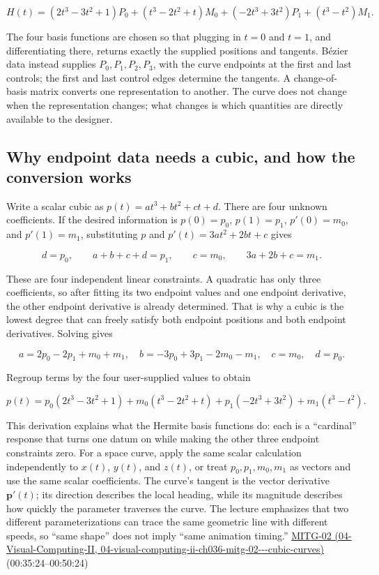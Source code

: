 \[
H(t)=(2t^3-3t^2+1)P_0+(t^3-2t^2+t)M_0+(-2t^3+3t^2)P_1+(t^3-t^2)M_1.
\]

The four basis functions are chosen so that plugging in \(t=0\) and \(t=1\), and differentiating there, returns exactly the supplied positions and tangents. Bézier data instead supplies \(P_0,P_1,P_2,P_3\), with the curve endpoints at the first and last controls; the first and last control edges determine the tangents. A change-of-basis matrix converts one representation to another. The curve does not change when the representation changes; what changes is which quantities are directly available to the designer.

\subsection{Why endpoint data needs a cubic, and how the conversion works}\label{03-visual-computing-i-ch001-why-endpoint-data-needs-a-cubic-and-how-the-conversion-works}

Write a scalar cubic as \(p(t)=at^3+bt^2+ct+d\). There are four unknown coefficients. If the desired information is \(p(0)=p_0\), \(p(1)=p_1\), \(p'(0)=m_0\), and \(p'(1)=m_1\), substituting \(p\) and \(p'(t)=3at^2+2bt+c\) gives

\[
d=p_0,\qquad a+b+c+d=p_1,\qquad c=m_0,\qquad 3a+2b+c=m_1.
\]

These are four independent linear constraints. A quadratic has only three coefficients, so after fitting its two endpoint values and one endpoint derivative, the other endpoint derivative is already determined. That is why a cubic is the lowest degree that can freely satisfy both endpoint positions and both endpoint derivatives. Solving gives

\[
a=2p_0-2p_1+m_0+m_1,\quad
b=-3p_0+3p_1-2m_0-m_1,\quad
c=m_0,\quad d=p_0.
\]

Regroup terms by the four user-supplied values to obtain

\[
p(t)=p_0(2t^3-3t^2+1)+m_0(t^3-2t^2+t)+p_1(-2t^3+3t^2)+m_1(t^3-t^2).
\]

This derivation explains what the Hermite basis functions do: each is a ``cardinal'' response that turns one datum on while making the other three endpoint constraints zero. For a space curve, apply the same scalar calculation independently to \(x(t)\), \(y(t)\), and \(z(t)\), or treat \(p_0,p_1,m_0,m_1\) as vectors and use the same scalar coefficients. The curve's tangent is the vector derivative \(\boldsymbol{p}'(t)\); its direction describes the local heading, while its magnitude describes how quickly the parameter traverses the curve. The lecture emphasizes that two different parameterizations can trace the same geometric line with different speeds, so ``same shape'' does not imply ``same animation timing.'' \href{../04-Visual-Computing-II/main.pdf\#nameddest=04-visual-computing-ii-ch036-mitg-02---cubic-curves}{MITG-02 (04-Visual-Computing-II, 04-visual-computing-ii-ch036-mitg-02-\/-\/-cubic-curves)} (00:35:24--00:50:24)

